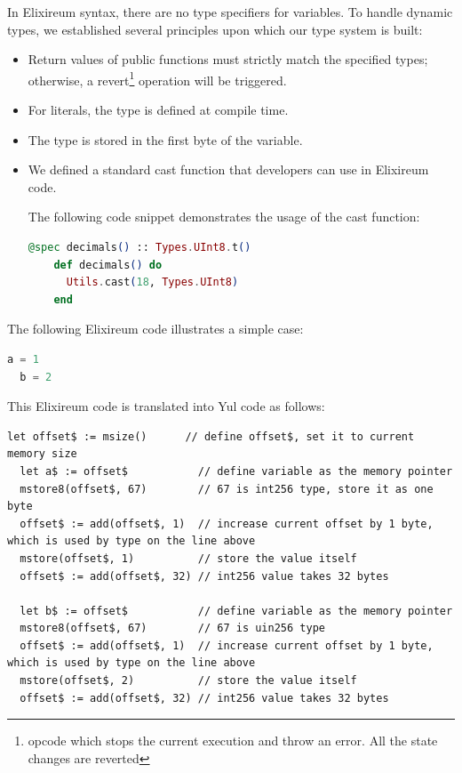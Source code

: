 In Elixireum syntax, there are no type specifiers for variables. To handle dynamic types, we established several principles upon which our type system is built:
\begin{itemize}
  \item Return values of public functions must strictly match the specified types; otherwise, a revert\footnote{opcode which stops the current execution and throw an error. All the state changes are reverted} operation will be triggered.
  \item For literals, the type is defined at compile time.
  \item The type is stored in the first byte of the variable.
  \item We defined a standard cast function that developers can use in Elixireum code.

  The following code snippet demonstrates the usage of the cast function:
  \begin{lstlisting}[caption={Example of cast function usage}, language=elixir, label={lst:contract_structure}]
    @spec decimals() :: Types.UInt8.t()
    def decimals() do
      Utils.cast(18, Types.UInt8)
    end  
  \end{lstlisting}
\end{itemize}

The following Elixireum code illustrates a simple case:

\begin{lstlisting}[caption={Elixireum code for simple case}, language=elixir]
  a = 1
  b = 2
\end{lstlisting}

This Elixireum code is translated into Yul code as follows:

\begin{lstlisting}[caption={Generated yul code for simple case}, language=yul]
  let offset$ := msize()      // define offset$, set it to current memory size 
  let a$ := offset$           // define variable as the memory pointer
  mstore8(offset$, 67)        // 67 is int256 type, store it as one byte
  offset$ := add(offset$, 1)  // increase current offset by 1 byte, which is used by type on the line above
  mstore(offset$, 1)          // store the value itself
  offset$ := add(offset$, 32) // int256 value takes 32 bytes

  let b$ := offset$           // define variable as the memory pointer
  mstore8(offset$, 67)        // 67 is uin256 type
  offset$ := add(offset$, 1)  // increase current offset by 1 byte, which is used by type on the line above
  mstore(offset$, 2)          // store the value itself
  offset$ := add(offset$, 32) // int256 value takes 32 bytes
\end{lstlisting}

